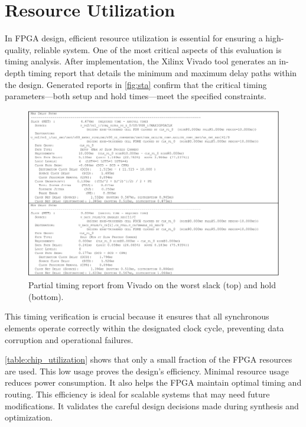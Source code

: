 \section{Resource Utilization}

In FPGA design, efficient resource utilization is essential for ensuring a high-quality, reliable system. One of the most critical aspects of this evaluation is timing analysis. After implementation, the Xilinx Vivado tool generates an in-depth timing report that details the minimum and maximum delay paths within the design. Generated reports in \autoref{fig:sta} confirm that the critical timing parameters—both setup and hold times—meet the specified constraints.
\begin{figure}[ht]
    \centering
    \includegraphics[width=1\linewidth]{figures/timimg_report.png}
    \caption{Partial timing report from Vivado on the worst slack (top) and hold (bottom).}
    \label{fig:sta}
\end{figure}
This timing verification is crucial because it ensures that all synchronous elements operate correctly within the designated clock cycle, preventing data corruption and operational failures. 

\autoref{table:chip_utilization} shows that only a small fraction of the FPGA resources are used. This low usage proves the design's efficiency. Minimal resource usage reduces power consumption. It also helps the FPGA maintain optimal timing and routing. This efficiency is ideal for scalable systems that may need future modifications. It validates the careful design decisions made during synthesis and optimization.


